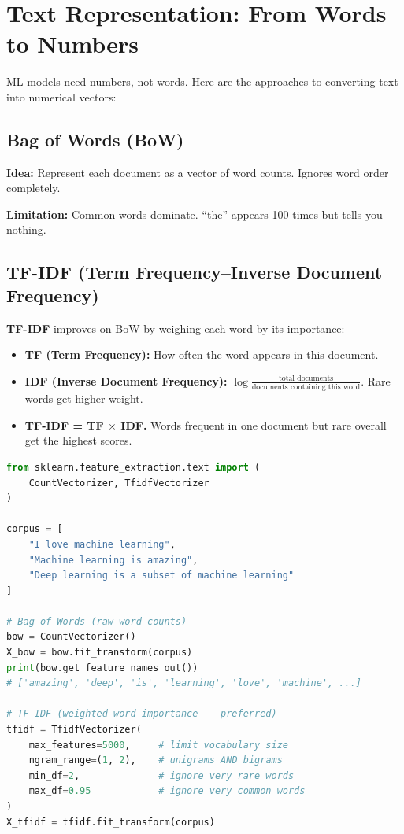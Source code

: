 \documentclass[12pt, a4paper, oneside]{book}
\begin{document}
\section{Text Representation: From Words to Numbers}

ML models need numbers, not words. Here are the approaches to converting text into numerical vectors:

\subsection{Bag of Words (BoW)}

\textbf{Idea:} Represent each document as a vector of word counts. Ignores word order completely.

\textbf{Limitation:} Common words dominate. ``the'' appears 100 times but tells you nothing.

\subsection{TF-IDF (Term Frequency--Inverse Document Frequency)}

\textbf{TF-IDF} improves on BoW by weighing each word by its importance:

\begin{itemize}[leftmargin=2em]
    \item \textbf{TF (Term Frequency):} How often the word appears in this document.
    \item \textbf{IDF (Inverse Document Frequency):} $\log\frac{\text{total documents}}{\text{documents containing this word}}$. Rare words get higher weight.
    \item \textbf{TF-IDF = TF $\times$ IDF.} Words frequent in one document but rare overall get the highest scores.
\end{itemize}

\begin{lstlisting}[language=Python, caption={Bag of Words and TF-IDF}]
from sklearn.feature_extraction.text import (
    CountVectorizer, TfidfVectorizer
)

corpus = [
    "I love machine learning",
    "Machine learning is amazing",
    "Deep learning is a subset of machine learning"
]

# Bag of Words (raw word counts)
bow = CountVectorizer()
X_bow = bow.fit_transform(corpus)
print(bow.get_feature_names_out())
# ['amazing', 'deep', 'is', 'learning', 'love', 'machine', ...]

# TF-IDF (weighted word importance -- preferred)
tfidf = TfidfVectorizer(
    max_features=5000,     # limit vocabulary size
    ngram_range=(1, 2),    # unigrams AND bigrams
    min_df=2,              # ignore very rare words
    max_df=0.95            # ignore very common words
)
X_tfidf = tfidf.fit_transform(corpus)
\end{lstlisting}
\end{document}
